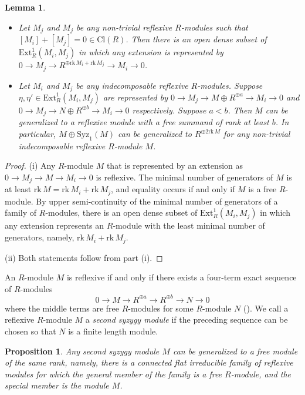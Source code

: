 \documentclass{amsart}[12pt]
\newtheorem{lemma}[theorem]{Lemma}
\newtheorem{prop}[theorem]{Proposition}
\theoremstyle{definition}
\theoremstyle{remark}
\numberwithin{equation}{section}
\begin{document}
\begin{lemma}\label{generic}
\begin{itemize}
\item[(i)] Let $M_j$ and $M_j$ be any non-trivial reflexive $R$-modules such that $[M_i] + [M_j] = 0 \in \mathrm{Cl}(R)$. Then there is an open dense subset of $\mathrm{Ext}^1_R(M_i, M_j)$ in which any extension is represented by $0 \to M_j \to R^{\oplus  \mathrm{rk}\, M_i + \mathrm{rk}\, M_j} \to M_i \to 0$.
\item[(ii)] Let $M_i$ and $M_j$ be any indecomposable reflexive $R$-modules. Suppose $\eta, \eta' \in \mathrm{Ext}^1_R(M_i, M_j)$ are represented by $0 \to M_j \to M \oplus R^{\oplus a} \to M_i \to 0$ and $0 \to M_j \to N \oplus R^{\oplus b} \to M_i \to 0$ respectively. Suppose $a < b$. Then $M$ can be generalized to a reflexive module with a free summand of rank at least $b$. In particular, $M \oplus \mathrm{Syz}_1(M)$ can be generalized to $R^{\oplus 2 \mathrm{rk} \, M}$ for any non-trivial indecomposable reflexive $R$-module $M$. 
\end{itemize}
\end{lemma}
\begin{proof}
(i) Any $R$-module $M$ that is represented by an extension as $0 \to M_j \to M \to M_i \to 0$ is reflexive. The minimal number of generators of $M$ is at least $\mathrm{rk}\, M = \mathrm{rk}\, M_i + \mathrm{rk}\, M_j$, and equality occurs if and only if $M$ is a free $R$-module. By upper semi-continuity of the minimal number of generators of a family of $R$-modules, there is an open dense subset of $\mathrm{Ext}^1_R(M_i, M_j)$ in which any extension represents an $R$-module with the least minimal number of generators, namely, $\mathrm{rk}\, M_i + \mathrm{rk}\, M_j$. 

(ii) Both statements follow from part (i). 
\end{proof}


An $R$-module $M$ is reflexive if and only if there exists a four-term exact sequence of $R$-modules
\[
0 \to M \to R^{\oplus a} \to R^{\oplus b} \to N \to 0
\]
where the middle terms are free $R$-modules for some $R$-module $N$ (\cite[Lemma 1.1(a)]{AR89}). We call a reflexive $R$-module $M$ a \textit{second syzygy module} if the preceding sequence can be chosen so that $N$ is a finite length module. 

\begin{prop}\label{key}
Any second syzygy module $M$ can be generalized to a free module of the same rank, namely, there is a connected flat irreducible family of reflexive modules for which the general member of the family is a free $R$-module, and the special member is the module $M$. 
\end{prop}
\end{document}
